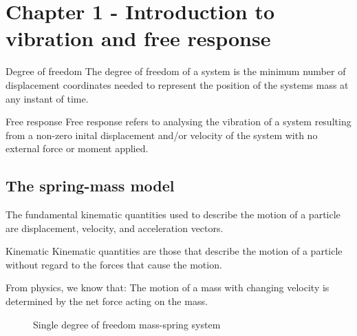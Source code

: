 \chapter*{Chapter 1 - Introduction to vibration and free response}

  \begin{fmd-definition}{Degree of freedom}
    The degree of freedom of a system is the minimum number of displacement coordinates needed to represent the position of the systems mass at any instant of time.
  \end{fmd-definition}

  \begin{fmd-definition}{Free response}
    Free response refers to analysing the vibration of a system resulting from a non-zero inital displacement and/or velocity of the system with no external force or moment applied.
  \end{fmd-definition}

  \section{The spring-mass model}
    The fundamental kinematic quantities used to describe the motion of a particle are displacement, velocity, and acceleration vectors.

    \begin{fmd-definition}{Kinematic}
      Kinematic quantities are those that describe the motion of a particle without regard to the forces that cause the motion.
    \end{fmd-definition}

    From physics, we know that: The motion of a mass with changing velocity is determined by the net force acting on the mass.
    \begin{figure}
      \centering
      \caption{Single degree of freedom mass-spring system}\label{fig:single-dof-mass-spring}
    \end{figure}

